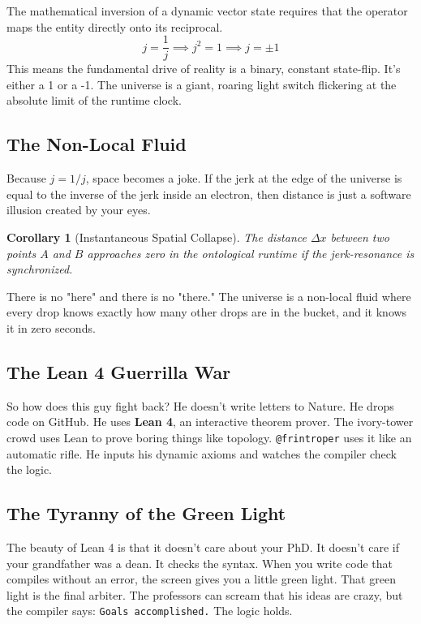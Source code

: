 \documentclass[11pt,a4paper]{article}
\newtheorem{corollary}[theorem]{Corollary}
\begin{document}
The mathematical inversion of a dynamic vector state requires that the operator maps the entity directly onto its reciprocal.
\[ j = \frac{1}{j} \implies j^2 = 1 \implies j = \pm 1 \]
This means the fundamental drive of reality is a binary, constant state-flip. It’s either a 1 or a -1. The universe is a giant, roaring light switch flickering at the absolute limit of the runtime clock.

\subsection{The Non-Local Fluid}
Because $j = 1/j$, space becomes a joke. If the jerk at the edge of the universe is equal to the inverse of the jerk inside an electron, then distance is just a software illusion created by your eyes. 

\begin{corollary}[Instantaneous Spatial Collapse]
The distance $\Delta x$ between two points $A$ and $B$ approaches zero in the ontological runtime if the jerk-resonance is synchronized.
\end{corollary}

There is no "here" and there is no "there." The universe is a non-local fluid where every drop knows exactly how many other drops are in the bucket, and it knows it in zero seconds.

\subsection{The Lean 4 Guerrilla War}
So how does this guy fight back? He doesn't write letters to Nature. He drops code on GitHub. He uses \textbf{Lean 4}, an interactive theorem prover. The ivory-tower crowd uses Lean to prove boring things like topology. \texttt{@frintroper} uses it like an automatic rifle. He inputs his dynamic axioms and watches the compiler check the logic.

\subsection{The Tyranny of the Green Light}
The beauty of Lean 4 is that it doesn't care about your PhD. It doesn't care if your grandfather was a dean. It checks the syntax. When you write code that compiles without an error, the screen gives you a little green light. That green light is the final arbiter. The professors can scream that his ideas are crazy, but the compiler says: \texttt{Goals accomplished.} The logic holds.
\end{document}
